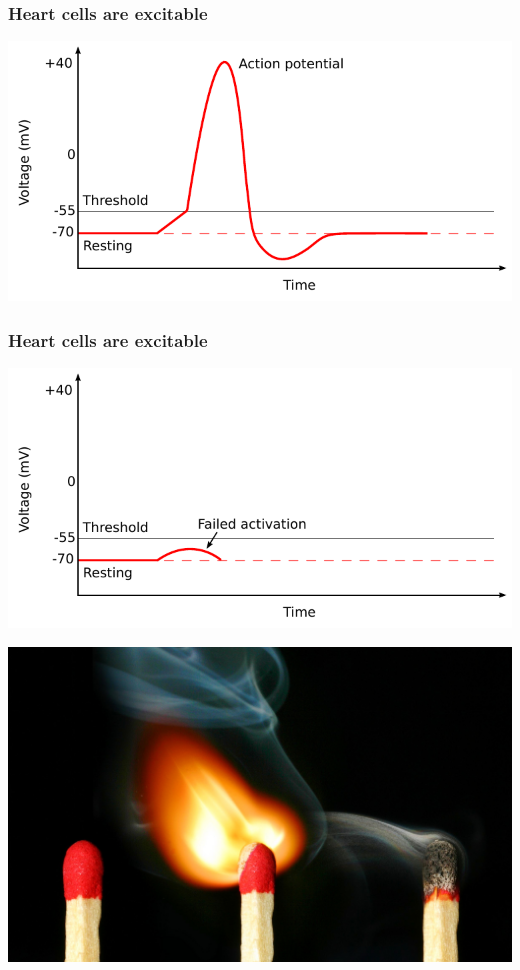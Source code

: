 \documentclass[norsk, 12pt]{beamer}
\begin{document}
\begin{frame}[fragile]
\frametitle{Heart cells are excitable}
\begin{center}
\includegraphics[width=\textwidth]{ap3.pdf}
\end{center}
\end{frame}

\begin{frame}[fragile]
\frametitle{Heart cells are excitable}
\begin{center}
\includegraphics[width=\textwidth]{ap4.pdf}
\end{center}
\end{frame}

\begin{frame}[fragile]
\begin{center}
\includegraphics[width=\textwidth]{ap5.jpeg}
\end{center}
\end{frame}
\end{document}
